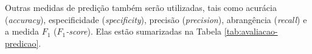 Outras medidas de predição também serão utilizadas, tais como acurácia (\textit{accuracy}), especificidade (\textit{specificity}), precisão (\textit{precision}), abrangência (\textit{recall}) e a medida $F_1$ (\textit{$F_1$-score}). Elas estão sumarizadas na Tabela \ref{tab:avaliacao-predicao}.





